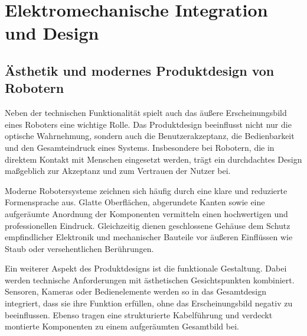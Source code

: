 
\section{Elektromechanische Integration und Design}
\label{sec:Elektromechanische}

\subsection{Ästhetik und modernes Produktdesign von Robotern}

Neben der technischen Funktionalität spielt auch das äußere Erscheinungsbild eines Roboters eine wichtige Rolle. Das Produktdesign beeinflusst nicht nur die optische Wahrnehmung, sondern auch die Benutzerakzeptanz, die Bedienbarkeit und den Gesamteindruck eines Systems. Insbesondere bei Robotern, die in direktem Kontakt mit Menschen eingesetzt werden, trägt ein durchdachtes Design maßgeblich zur Akzeptanz und zum Vertrauen der Nutzer bei.

Moderne Robotersysteme zeichnen sich häufig durch eine klare und reduzierte Formensprache aus. Glatte Oberflächen, abgerundete Kanten sowie eine aufgeräumte Anordnung der Komponenten vermitteln einen hochwertigen und professionellen Eindruck. Gleichzeitig dienen geschlossene Gehäuse dem Schutz empfindlicher Elektronik und mechanischer Bauteile vor äußeren Einflüssen wie Staub oder versehentlichen Berührungen.

Ein weiterer Aspekt des Produktdesigns ist die funktionale Gestaltung. Dabei werden technische Anforderungen mit ästhetischen Gesichtspunkten kombiniert. Sensoren, Kameras oder Bedienelemente werden so in das Gesamtdesign integriert, dass sie ihre Funktion erfüllen, ohne das Erscheinungsbild negativ zu beeinflussen. Ebenso tragen eine strukturierte Kabelführung und verdeckt montierte Komponenten zu einem aufgeräumten Gesamtbild bei.

